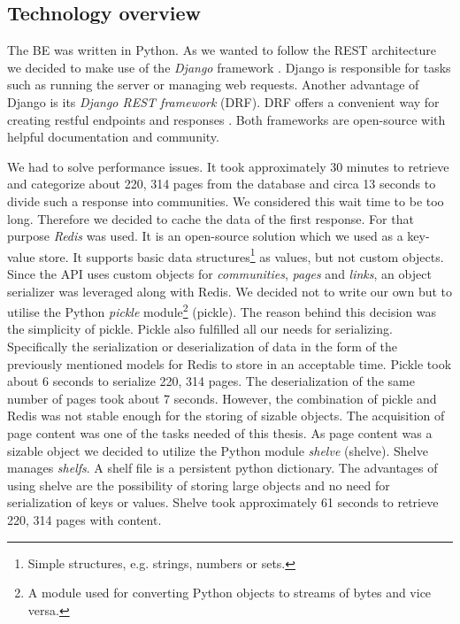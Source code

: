 \subsection{Technology overview}
\label{technologyOverview}
The BE was written in Python. As we wanted to follow the REST architecture we decided to make use of the \textit{Django} framework \cite{meetDjango}. Django is responsible for tasks such as running the server or managing web requests. Another advantage of Django is its \textit{Django REST framework} (DRF). DRF offers a convenient way for creating restful endpoints and responses \cite{djangoRest}. Both frameworks are open-source with helpful documentation and community. 

We had to solve performance issues. It took approximately 30 minutes to retrieve and categorize about 220, 314 pages from the database and circa 13 seconds to divide such a response into communities. We considered this wait time to be too long. Therefore we decided to cache the data of the first response. For that purpose \textit{Redis} \cite{redis} was used. It is an open-source solution which we used as a key-value store. It supports basic data structures\footnote{Simple structures, e.g. strings, numbers or sets.} as values, but not custom objects. Since the API uses custom objects for \textit{communities}, \textit{pages} and \textit{links}, an object serializer was leveraged along with Redis. We decided not to write our own but to utilise the Python \textit{pickle} module\footnote{A module used for converting Python objects to streams of bytes and vice versa.} \cite{pickle} (pickle). The reason behind this decision was the simplicity of pickle. Pickle also fulfilled all our needs for serializing. Specifically the serialization or deserialization of data in the form of the previously mentioned models for Redis to store in an acceptable time. Pickle took about 6 seconds to serialize 220, 314 pages. The deserialization of the same number of pages took about 7 seconds. However, the combination of pickle and Redis was not stable enough for the storing of sizable objects. The acquisition of page content was one of the tasks needed of this thesis. As page content was a sizable object we decided to utilize the Python module \textit{shelve} \cite{shelve} (shelve). Shelve manages \textit{shelfs}. A shelf file is a persistent python dictionary. The advantages of using shelve are the possibility of storing large objects and no need for serialization of keys or values. Shelve took approximately 61 seconds to retrieve 220, 314 pages with content. 

